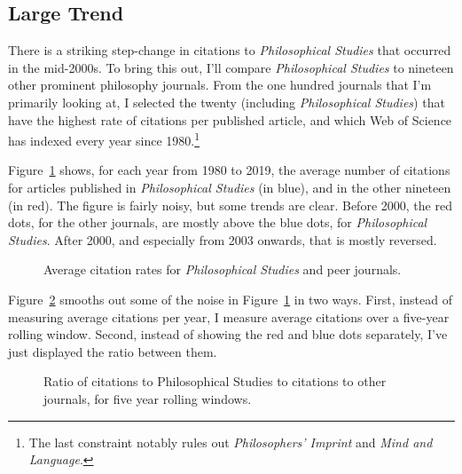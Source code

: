\documentclass[
  10pt,
  letterpaper,
  DIV=11,
  numbers=noendperiod,
  twoside]{scrartcl}
\begin{document}
\subsection{Large Trend}\label{sec-large-trend}

There is a striking step-change in citations to \emph{Philosophical
Studies} that occurred in the mid-2000s. To bring this out, I'll compare
\emph{Philosophical Studies} to nineteen other prominent philosophy
journals. From the one hundred journals that I'm primarily looking at, I
selected the twenty (including \emph{Philosophical Studies}) that have
the highest rate of citations per published article, and which Web of
Science has indexed every year since 1980.\footnote{The last constraint
  notably rules out \emph{Philosophers' Imprint} and \emph{Mind and
  Language}.}

Figure~\ref{fig-compare-cites-dots} shows, for each year from 1980 to
2019, the average number of citations for articles published in
\emph{Philosophical Studies} (in blue), and in the other nineteen (in
red). The figure is fairly noisy, but some trends are clear. Before
2000, the red dots, for the other journals, are mostly above the blue
dots, for \emph{Philosophical Studies}. After 2000, and especially from
2003 onwards, that is mostly reversed.

\begin{figure}


\caption{\label{fig-compare-cites-dots}Average citation rates for
\emph{Philosophical Studies} and peer journals.}

\end{figure}%

Figure~\ref{fig-compare-cites-rolling} smooths out some of the noise in
Figure~\ref{fig-compare-cites-dots} in two ways. First, instead of
measuring average citations per year, I measure average citations over a
five-year rolling window. Second, instead of showing the red and blue
dots separately, I've just displayed the ratio between them.

\begin{figure}


\caption{\label{fig-compare-cites-rolling}Ratio of citations to
Philosophical Studies to citations to other journals, for five year
rolling windows.}

\end{figure}%
\end{document}
